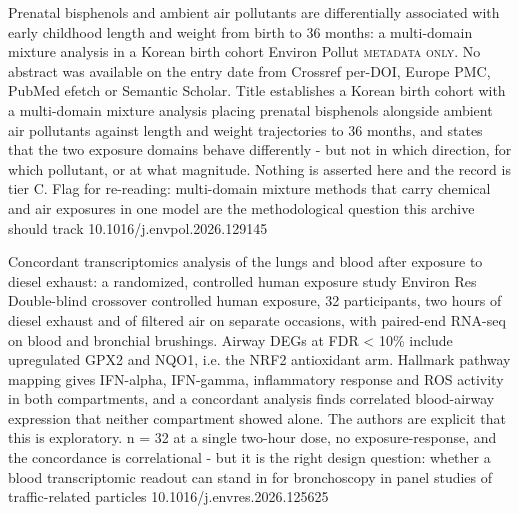 \documentclass[10pt]{article}
\begin{document}

{Prenatal bisphenols and ambient air pollutants are differentially associated with early childhood length and weight from birth to 36 months: a multi-domain mixture analysis in a Korean birth cohort}
{Environ Pollut}
{\textsc{metadata only.} No abstract was available on the entry date from Crossref per-DOI, Europe PMC, PubMed efetch or Semantic Scholar. Title establishes a Korean birth cohort with a multi-domain mixture analysis placing prenatal bisphenols alongside ambient air pollutants against length and weight trajectories to 36 months, and states that the two exposure domains behave differently - but not in which direction, for which pollutant, or at what magnitude. Nothing is asserted here and the record is tier C. Flag for re-reading: multi-domain mixture methods that carry chemical and air exposures in one model are the methodological question this archive should track}
{10.1016/j.envpol.2026.129145}


{Concordant transcriptomics analysis of the lungs and blood after exposure to diesel exhaust: a randomized, controlled human exposure study}
{Environ Res}
{Double-blind crossover controlled human exposure, 32 participants, two hours of diesel exhaust and of filtered air on separate occasions, with paired-end RNA-seq on blood and bronchial brushings. Airway DEGs at FDR < 10\% include upregulated GPX2 and NQO1, i.e. the NRF2 antioxidant arm. Hallmark pathway mapping gives IFN-alpha, IFN-gamma, inflammatory response and ROS activity in both compartments, and a concordant analysis finds correlated blood-airway expression that neither compartment showed alone. The authors are explicit that this is exploratory. n = 32 at a single two-hour dose, no exposure-response, and the concordance is correlational - but it is the right design question: whether a blood transcriptomic readout can stand in for bronchoscopy in panel studies of traffic-related particles}
{10.1016/j.envres.2026.125625}

\end{document}
